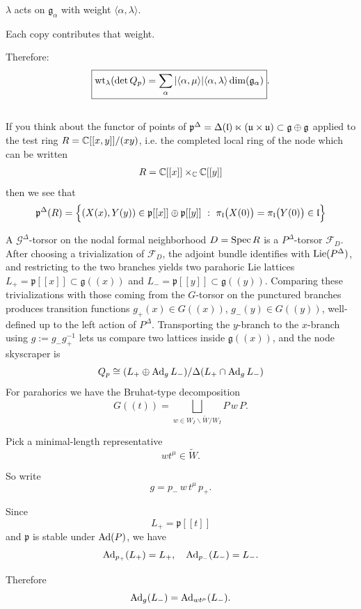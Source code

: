 \documentclass[12pt]{article}
\begin{document}
$\lambda$ acts on $\mathfrak{g}_\alpha$ with weight $\langle\alpha,\lambda\rangle$.

Each copy contributes that weight.

Therefore:
\[
\boxed{\operatorname{wt}_\lambda(\det Q_p) = \sum_{\alpha} |\langle\alpha,\mu\rangle| \langle\alpha,\lambda\rangle \dim(\mathfrak{g}_\alpha)}.
\]

\subsection{}
If you think about the functor of points of $
\mathfrak{p}^\Delta = \Delta(\mathfrak{l}) \ltimes (\mathfrak{u} \times \mathfrak{u}) \subset \mathfrak{g} \oplus \mathfrak{g}$ applied to the test ring $R = \mathbb{C}[[x,y]]/(xy)$, i.e. the completed local ring of the node which can be written \begin{align*}
    R = \mathbb{C}[[x]] \times_{\mathbb{C}} \mathbb{C}[[y]]
\end{align*}
then we see that \[
\mathfrak p^\Delta (R)
=
\Bigl\{(X(x),Y(y))\in \mathfrak p[[x]]\oplus \mathfrak p[[y]]
\ :\
\pi_{\mathfrak l}\bigl(X(0)\bigr)=\pi_{\mathfrak l}\bigl(Y(0)\bigr)\in \mathfrak l
\Bigr\}\]

A $\mathcal{G}^\Delta$-torsor on the nodal formal neighborhood $D=\operatorname{Spec} R$ is a $P^\Delta$-torsor $\mathcal{F}_D$. After choosing a trivialization of $\mathcal{F}_D$, the adjoint bundle identifies with $\operatorname{Lie}(P^\Delta)$, and restricting to the two branches yields two parahoric Lie lattices $L_+=\mathfrak{p}[[x]]\subset\mathfrak{g}((x))$ and $L_-=\mathfrak{p}[[y]]\subset\mathfrak{g}((y))$. Comparing these trivializations with those coming from the $G$-torsor on the punctured branches produces transition functions $g_+(x)\in G((x))$, $g_-(y)\in G((y))$, well-defined up to the left action of $P^\Delta$. Transporting the $y$-branch to the $x$-branch using $g:=g_-g_+^{-1}$ lets us compare two lattices inside $\mathfrak{g}((x))$, and the node skyscraper is
\[
Q_p\cong (L_+\oplus \operatorname{Ad}_gL_-)/\Delta(L_+\cap \operatorname{Ad}_gL_-)
\]
For parahorics we have the Bruhat-type decomposition
\[
G((t))
=
\bigsqcup_{w \in W_I \backslash \widetilde{W} / W_I}
P\, w\, P.
\]

Pick a minimal-length representative
\[
w t^\mu \in \widetilde{W}.
\]

So write
\[
g = p_-\, w\, t^\mu\, p_+.
\]

Since
\[
L_+ = \mathfrak{p}[[t]]
\]
and $\mathfrak{p}$ is stable under $\operatorname{Ad}(P)$, we have
\[
\operatorname{Ad}_{p_+}(L_+) = L_+,
\quad
\operatorname{Ad}_{p_-}(L_-) = L_-.
\]

Therefore
\[
\operatorname{Ad}_g(L_-) = \operatorname{Ad}_{w t^\mu}(L_-).
\]
\end{document}
